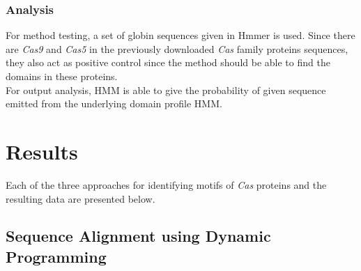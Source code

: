 \documentclass[11pt, oneside]{article}
\begin{document}
\medskip
\subsubsection{Analysis}
For method testing, a set of globin sequences given in Hmmer\cite{hmmer} is used. Since there are \textit{Cas9} and \textit{Cas5} in the previously downloaded \textit{Cas} family proteins sequences, they also act as positive control since the method should be able to find the domains in these proteins.\\
For output analysis, HMM is able to give the probability of given sequence emitted from the underlying domain profile HMM.





\section{Results}

Each of the three approaches for identifying motifs of \textit{Cas} proteins and the resulting data are presented below. 


\subsection{Sequence Alignment using Dynamic Programming}
\end{document}
